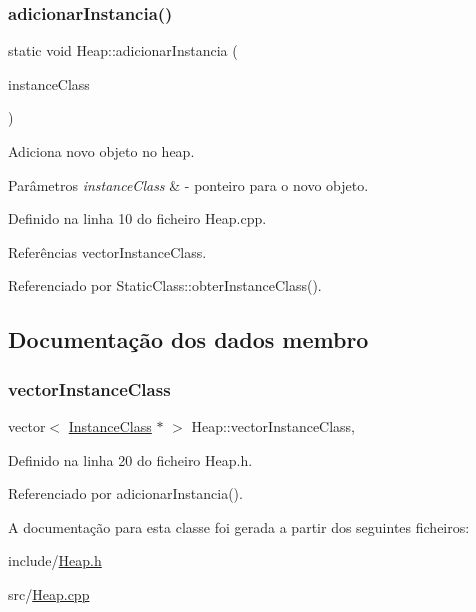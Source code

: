 \subsubsection{\texorpdfstring{adicionar\+Instancia()}{adicionarInstancia()}}
{\footnotesize\ttfamily static void Heap\+::adicionar\+Instancia (\begin{DoxyParamCaption}\item[{\hyperlink{classInstanceClass}{Instance\+Class} $\ast$}]{instance\+Class }\end{DoxyParamCaption})\hspace{0.3cm}{\ttfamily [static]}}



Adiciona novo objeto no heap. 


\begin{DoxyParams}{Parâmetros}
{\em instance\+Class} & -\/ ponteiro para o novo objeto. \\
\hline
\end{DoxyParams}


Definido na linha 10 do ficheiro Heap.\+cpp.



Referências vector\+Instance\+Class.



Referenciado por Static\+Class\+::obter\+Instance\+Class().



\subsection{Documentação dos dados membro}
\mbox{\label{classHeap_a228364dcf1e708ceadc9e1f38928169c}} 
\subsubsection{\texorpdfstring{vector\+Instance\+Class}{vectorInstanceClass}}
{\footnotesize\ttfamily vector$<$ \hyperlink{classInstanceClass}{Instance\+Class} $\ast$ $>$ Heap\+::vector\+Instance\+Class\hspace{0.3cm}{\ttfamily [static]}, {\ttfamily [private]}}



Definido na linha 20 do ficheiro Heap.\+h.



Referenciado por adicionar\+Instancia().



A documentação para esta classe foi gerada a partir dos seguintes ficheiros\+:\begin{DoxyCompactItemize}
\item 
include/\hyperlink{Heap_8h}{Heap.\+h}\item 
src/\hyperlink{Heap_8cpp}{Heap.\+cpp}\end{DoxyCompactItemize}
